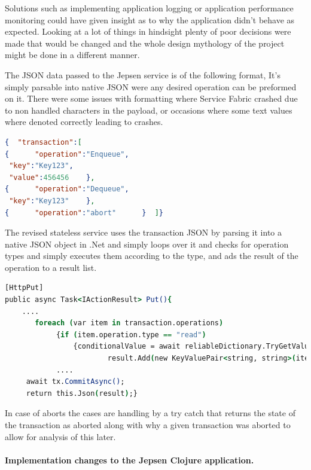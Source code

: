 \documentclass[a4paper,10pt,titlepage]{report}
\begin{document}
Solutions such as implementing application logging or application performance monitoring could have given insight as to why the application didn't behave as expected. Looking at a lot of things in hindsight plenty of poor decisions were made that would be changed and the whole design mythology of the project might be done in a different manner.

\vspace{5mm}

The JSON data passed to the Jepsen service is of the following format, It's simply parsable into native JSON were any desired operation can be preformed on it. There were some issues with formatting where Service Fabric crashed due to non handled characters in the payload, or occasions where some text values where denoted correctly leading to crashes. \\
\begin{lstlisting}[language=json]
{  "transaction":[
{      "operation":"Enqueue",
 "key":"Key123",
 "value":456456    },
{      "operation":"Dequeue",
 "key":"Key123"    },
{      "operation":"abort"      }  ]}
\end{lstlisting}  

The revised stateless service uses the transaction JSON by parsing it into a native JSON object in .Net and simply loops over it and checks for operation types and simply executes them according to the type, and ads the result of the operation to a result list.
\begin{lstlisting}[language=csh]
[HttpPut]
public async Task<IActionResult> Put(){
    ....
       foreach (var item in transaction.operations)
            {if (item.operation.type == "read")
                {conditionalValue = await reliableDictionary.TryGetValueAsync(tx, item.key.Value);
                        result.Add(new KeyValuePair<string, string>(item.key.Value, value.ToString()));}
            ....
     await tx.CommitAsync();
     return this.Json(result);}
\end{lstlisting}  

In case of aborts the cases are handling by a try catch that returns the state of the transaction as aborted along with why a given transaction was aborted to allow for analysis of this later.

\paragraph*{Implementation changes to the Jepsen Clojure application.}
\end{document}
